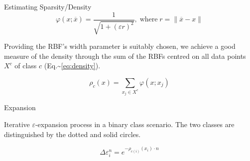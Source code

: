 \documentclass[smaller]{beamer}
\begin{document}
\begin{frame}[label={sec:org5ffef42}]{Estimating Sparsity/Density}
\begin{equation}
    \varphi(x; \overline{x}) =  \frac{1}{\sqrt{1 + (\varepsilon r)^2}},\; \text{where}\; r = \parallel \overline{x} - x \parallel
    \label{eq:rbf}
\end{equation}

\vspace{2em}

Providing the RBF's width parameter is suitably chosen, we achieve a good measure of
the density through the sum of the RBFs centred on all data points \(X^c\) of class \(c\)
(Eq.\textasciitilde{}\ref{eq:density}).

\vspace{2em}

\begin{equation}
    \rho_c(x) = \sum_{x_j \in X^c} \varphi(x; x_j)
    \label{eq:density}
\end{equation}
\end{frame}

\begin{frame}[label={sec:org2dd7a7d}]{Expansion}
\begin{figure}
    \centering
\label{fig:e_expansion}
\end{figure}

\begin{center}
\vspace{2em}Iterative $\varepsilon$-expansion process in a binary class scenario. The
two classes are distinguished by the dotted and solid circles.\vspace{1em}
\end{center}

\begin{equation*}
    \Delta\varepsilon_i^n=e^{-\rho_{c(i)}(x_i) \cdot n}
    \label{eq:step}
\end{equation*}
\end{frame}
\end{document}
